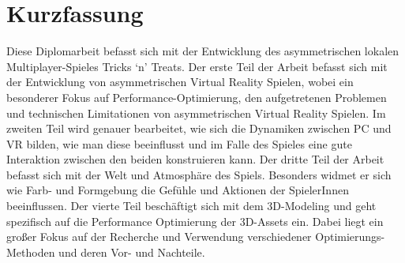 
\chapter{Kurzfassung}

Diese Diplomarbeit befasst sich mit der Entwicklung des asymmetrischen lokalen Multiplayer-Spieles Tricks ‘n’ Treats. 
Der erste Teil der Arbeit befasst sich mit der Entwicklung von asymmetrischen Virtual Reality Spielen, wobei ein besonderer Fokus auf Performance-Optimierung, den aufgetretenen Problemen und technischen Limitationen von asymmetrischen Virtual Reality Spielen. 
Im zweiten Teil wird genauer bearbeitet, wie sich die Dynamiken zwischen PC und VR bilden, wie man diese beeinflusst und im Falle des Spieles eine gute Interaktion zwischen den beiden konstruieren kann. 
Der dritte Teil der Arbeit befasst sich mit der Welt und Atmosphäre des Spiels. Besonders widmet er sich wie Farb- und Formgebung die Gefühle und Aktionen der SpielerInnen beeinflussen. 
Der vierte Teil beschäftigt sich mit dem 3D-Modeling und geht spezifisch auf die Performance Optimierung der 3D-Assets ein. Dabei liegt ein großer Fokus auf der Recherche und Verwendung verschiedener Optimierungs-Methoden und deren Vor- und Nachteile.
